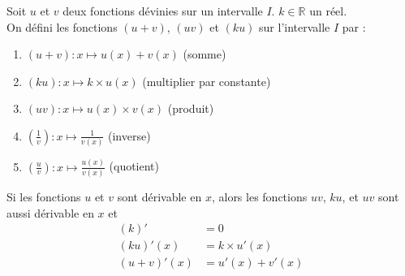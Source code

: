 \documentclass[main.tex]{subfiles}
\begin{document}
\begin{definition} Soit $u$ et $v$ deux fonctions dévinies sur un intervalle $I$. $k\in\mathbb{R}$ un réel.\\
 On défini les fonctions $(u+v)$, $(uv)$ et $(ku)$ sur l'intervalle $I$ par :
	\begin{enumerate}[label=\textbullet,leftmargin=*]
		\item $(u+v)\colon x\mapsto u(x)+v(x)$ (somme)
		\item    $(ku)\colon x\mapsto k\times u(x)$ (multiplier par constante)
		\item  $(uv)\colon x\mapsto u(x)\times v(x)$  (produit)
		\item  $\left(\frac{1}{v}\right)\colon x\mapsto \frac{1}{v(x)}$  (inverse)
		\item  $\left(\frac{u}{v}\right)\colon x\mapsto\frac{u(x)}{v(x)} $  (quotient)
	\end{enumerate}
\end{definition}
\begin{proposition} Si les fonctions $u$ et $v$ sont dérivable en $x$, alors les fonctions $uv$, $ku$, et $uv$ sont aussi dérivable en $x$  et 
	\setlength{\abovedisplayskip}{3pt}
	\setlength{\belowdisplayskip}{3pt}
	\begin{align*}
		(k)'& = 0\\
		(ku)'(x)& = k\times u'(x) \\
		 (u+v)'(x)&=u'(x)+v'(x)%
	\end{align*} 
\end{proposition}
\end{document}
